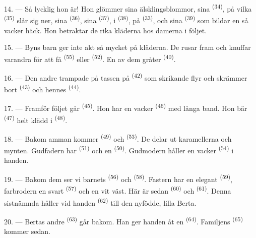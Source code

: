 14. --- Så lycklig hon är! Hon glömmer sina älsklingsblommor, sina
 \textsuperscript{(34)}, på vilka 
\textsuperscript{(35)} slår sig ner, sina  \textsuperscript{(36)}, sina
 \textsuperscript{(37)}, i
 \textsuperscript{(38)}, på 
\textsuperscript{(33)}, och sina  \textsuperscript{(39)} som bildar en så vacker
häck. Hon betraktar de rika kläderna hos damerna i följet.

15. --- Byns barn ger inte akt så mycket på kläderna. De rusar fram och knuffar varandra för
att få  \textsuperscript{(55)} eller
 \textsuperscript{(52)}. En av dem gråter \textsuperscript{(40)}.

16. --- Den andre trampade på tassen på  \textsuperscript{(42)} som skrikande
flyr och skrämmer bort  \textsuperscript{(43)} och hennes 
\textsuperscript{(44)}.

\VUsaut{5.0mm}
\VUsaut{4.0mm}

17. --- Framför följet går  \textsuperscript{(45)}. Hon har en vacker
 \textsuperscript{(46)} med långa band. Hon bär
 \textsuperscript{(47)} helt klädd i 
\textsuperscript{(48)}.

18. --- Bakom amman kommer  \textsuperscript{(49)} och
 \textsuperscript{(53)}. De delar ut karamellerna och mynten.
Gudfadern har  \textsuperscript{(51)} och en 
\textsuperscript{(50)}. Gudmodern håller en vacker  \textsuperscript{(54)} i
handen.

19. --- Bakom dem ser vi barnets  \textsuperscript{(56)} och
 \textsuperscript{(58)}. Fastern har en elegant 
\textsuperscript{(59)}, farbrodern en svart  \textsuperscript{(57)} och en vit
väst. Här är sedan  \textsuperscript{(60)} och 
\textsuperscript{(61)}. Denna sistnämnda håller vid handen 
\textsuperscript{(62)} till den nyfödde, lilla Berta.

20. --- Bertas andre  \textsuperscript{(63)} går bakom. Han ger handen åt en
 \textsuperscript{(64)}. Familjens
 \textsuperscript{(65)} kommer sedan.

